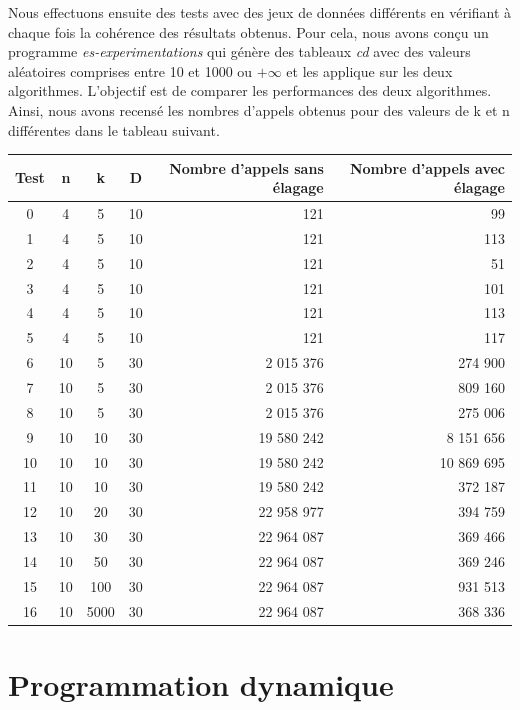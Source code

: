 \documentclass[a4paper, titlepage]{article}
\begin{document}
	Nous effectuons ensuite des tests avec des jeux de données différents en vérifiant à chaque fois la cohérence des résultats obtenus.
	Pour cela, nous avons conçu un programme \emph{es-experimentations} qui génère des tableaux \emph{cd} avec des valeurs aléatoires comprises entre 10 et 1000 ou $+\infty$ et les applique sur les deux algorithmes.
	L'objectif est de comparer les performances des deux algorithmes.
	Ainsi, nous avons recensé les nombres d'appels obtenus pour des valeurs de k et n différentes dans le tableau suivant.

	\begin{center}
		\begin{tabular}{|c|c|c|c|r|r|}
			\hline
			Test	& n	& k	& D	& Nombre d'appels sans élagage & Nombre d'appels avec élagage \\
			\hline
			0 	& 4	& 5	& 10	& 121 	& 99 \\
			\hline
			1 	& 4	& 5	& 10 	& 121	& 113 \\
			2 	& 4	& 5	& 10 	& 121	& 51 \\
			3 	& 4	& 5	& 10 	& 121	& 101 \\
			4 	& 4	& 5	& 10 	& 121	& 113 \\
			5 	& 4	& 5	& 10 	& 121	& 117 \\
			\hline
			6 	& 10	& 5	& 30 	& 2 015 376 	& 274 900 \\
			7 	& 10	& 5	& 30 	& 2 015 376 	& 809 160 \\
			8 	& 10	& 5	& 30 	& 2 015 376 	& 275 006 \\
			\hline
			9 	& 10	& 10	& 30 	& 19 580 242 	& 8 151 656 \\
			10 	& 10	& 10	& 30 	& 19 580 242 	& 10 869 695 \\
			11 	& 10	& 10	& 30 	& 19 580 242 	& 372 187 \\
			\hline
			12 	& 10	& 20	& 30 	& 22 958 977 	& 394 759 \\
			13 	& 10	& 30	& 30 	& 22 964 087 	& 369 466 \\
			14 	& 10	& 50	& 30 	& 22 964 087 	& 369 246 \\
			\hline
			15 	& 10	& 100	& 30 	& 22 964 087 	& 931 513 \\
			16 	& 10	& 5000 	& 30 	& 22 964 087 	& 368 336 \\

			\hline
		\end{tabular}
	\end{center}


\section{Programmation dynamique}
\end{document}
